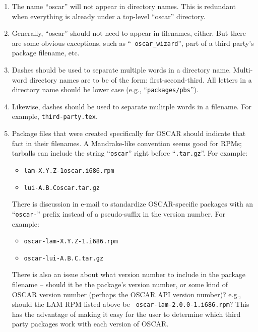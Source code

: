 \begin{enumerate}
\item The name ``oscar'' will not appear in directory names.  This is
  redundant when everything is already under a top-level ``oscar''
  directory.
  
\item Generally, ``oscar'' should not need to appear in filenames,
  either.  But there are some obvious exceptions, such as ``{\tt
    oscar\_wizard}'', part of a third party's package filename, etc.
  
\item Dashes should be used to separate multiple words in a directory
  name.  Multi-word directory names are to be of the form:
  first-second-third.  All letters in a directory name should be lower
  case (e.g., ``{\tt packages/pbs}'').

\item Likewise, dashes should be used to separate mulitple words in a
  filename.  For example, {\tt third-party.tex}.
  
\item Package files that were created specifically for OSCAR should
  indicate that fact in their filenames.  A Mandrake-like convention
  seems good for RPMs; tarballs can include the string ``{\tt oscar}''
  right before ``{\tt .tar.gz}''.  For example:

  \begin{itemize}
  \item {\tt lam-{\rm X}.{\rm Y}.{\rm Z}-1oscar.i686.rpm}
  \item {\tt lui-{\rm A}.{\rm B}.{\rm C}oscar.tar.gz}
  \end{itemize}
  
  \begin{discuss}
    There is discussion in e-mail to standardize OSCAR-specific
    packages with an ``{\tt oscar-}'' prefix instead of a
    pseudo-suffix in the version number.  For example:
  
    \begin{itemize}
    \item {\tt oscar-lam-{\rm X}.{\rm Y}.{\rm Z}-1.i686.rpm}
    \item {\tt oscar-lui-{\rm A}.{\rm B}.{\rm C}.tar.gz}
    \end{itemize}
  \end{discuss}
    
  \begin{discuss}
    There is also an issue about what version number to include in the
    package filename -- should it be the package's version number, or
    some kind of OSCAR version number (perhaps the OSCAR API version
    number)?  e.g., should the LAM RPM listed above be {\tt
    oscar-lam-2.0.0-1.i686.rpm}?  This has the advantage of making it
    easy for the user to determine which third party packages work
    with each version of OSCAR.


\end{discuss}
\end{enumerate}
